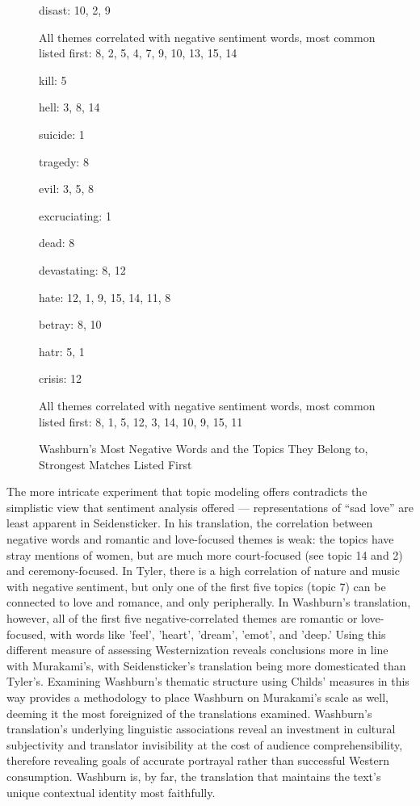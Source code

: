 \documentclass[12pt]{article}
\begin{document}
\begin{flushleft}
\begin{spacing}{2.0}
\begin{figure}
	disast: 10, 2, 9
	
	All themes correlated with negative sentiment words, most common listed first: 8, 2, 5, 4, 7, 9, 10, 13, 15, 14
\end{figure}

\begin{figure}
	\caption{Washburn's Most Negative Words and the Topics They Belong to, Strongest Matches Listed First}
	\label{washburn-sentiment-topics}
	kill: 5
	
	hell: 3, 8, 14
	
	suicide: 1
	
	tragedy: 8
	
	evil: 3, 5, 8
	
	excruciating: 1
	
	dead: 8
	
	devastating: 8, 12
	
	hate: 12, 1, 9, 15, 14, 11, 8
	
	betray: 8, 10
	
	hatr: 5, 1
	
	crisis: 12
	
	All themes correlated with negative sentiment words, most common listed first: 8, 1, 5, 12, 3, 14, 10, 9, 15, 11
\end{figure}

The more intricate experiment that topic modeling offers contradicts the simplistic view that sentiment analysis offered --- representations of ``sad love'' are least apparent in Seidensticker. In his translation, the correlation between negative words and romantic and love-focused themes is weak: the topics have stray mentions of women, but are much more court-focused (see topic 14 and 2) and ceremony-focused. In Tyler, there is a high correlation of nature and music with negative sentiment, but only one of the first five topics (topic 7) can be connected to love and romance, and only peripherally. In Washburn's translation, however, all of the first five negative-correlated themes are romantic or love-focused, with words like 'feel', 'heart', 'dream', 'emot', and 'deep.' Using this different measure of assessing Westernization reveals conclusions more in line with Murakami's, with Seidensticker's translation being more domesticated than Tyler's. Examining Washburn's thematic structure using Childs' measures in this way provides a methodology to place Washburn on Murakami's scale as well, deeming it the most foreignized of the translations examined. Washburn's translation's underlying linguistic associations reveal an investment in cultural subjectivity and translator invisibility at the cost of audience comprehensibility, therefore revealing goals of accurate portrayal rather than successful Western consumption. Washburn is, by far, the translation that maintains the text's unique contextual identity most faithfully. 


\end{spacing}
\end{flushleft}
\end{document}
